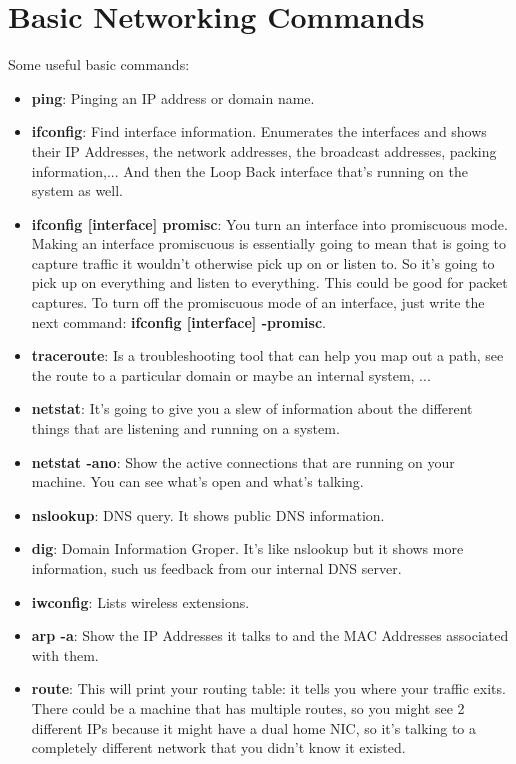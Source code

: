 \documentclass[11pt,a4paper]{article}
\begin{document}
\section{Basic Networking Commands}
Some useful basic commands:
\begin{itemize}
\item \textbf{ping}: Pinging an IP address or domain name.
\item \textbf{ifconfig}: Find interface information. Enumerates the interfaces and shows their IP Addresses, the network addresses, the broadcast addresses, packing information,... And then the Loop Back interface that's running on the system as well.
\item \textbf{ifconfig [interface] promisc}: You turn an interface into promiscuous mode. Making an interface promiscuous is essentially going to mean that is going to capture traffic it wouldn't otherwise pick up on or listen to. So it's going to pick up on everything and listen to everything. This could be good for packet captures. To turn off the promiscuous mode of an interface, just write the next command: \textbf{ifconfig [interface] -promisc}.
\item \textbf{traceroute}: Is a troubleshooting tool that can help you map out a path, see the route to a particular domain or maybe an internal system, ...
\item \textbf{netstat}: It's going to give you a slew of information about the different things that are listening and running on a system.
\item \textbf{netstat -ano}: Show the active connections that are running on your machine. You can see what's open and what's talking.
\item \textbf{nslookup}: DNS query. It shows public DNS information.
\item \textbf{dig}: Domain Information Groper. It's like nslookup but it shows more information, such us feedback from  our internal DNS server.
\item \textbf{iwconfig}: Lists wireless extensions.
\item \textbf{arp -a}: Show the IP Addresses it talks to and the MAC Addresses associated with them.
\item \textbf{route}: This will print your routing table: it tells you where your traffic exits. There could be a machine that has multiple routes, so you might see 2 different IPs because it might have a dual home NIC, so it's talking to a completely different network that you didn't know it existed.
\end{itemize}
\end{document}
